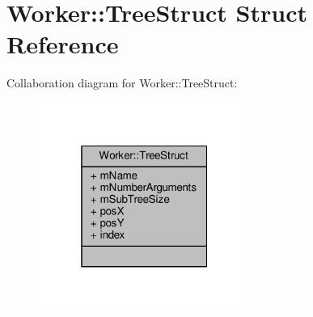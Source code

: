 \hypertarget{structWorker_1_1TreeStruct}{}\section{Worker\+:\+:Tree\+Struct Struct Reference}
\label{structWorker_1_1TreeStruct}


Collaboration diagram for Worker\+:\+:Tree\+Struct\+:
\nopagebreak
\begin{figure}[H]
\begin{center}
\leavevmode
\includegraphics[width=196pt]{structWorker_1_1TreeStruct__coll__graph}
\end{center}
\end{figure}
